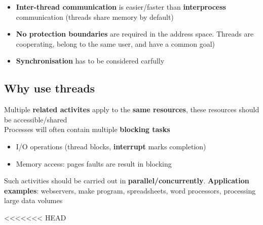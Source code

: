 \documentclass{article}
\begin{document}
\begin{itemize}
	\item \textbf{Inter-thread communication} is easier/faster than \textbf{interprocess} communication (threads share memory by default)
	\item \textbf{No protection boundaries} are required in the address space. Threads are cooperating, belong to the same user, and have a common goal)
	\item \textbf{Synchronisation} has to be considered carfully
\end{itemize}

\subsection{Why use threads}
\begin{flushleft}
Multiple \textbf{related activites} apply to the \textbf{same resources}, these resources should be accessible/shared\\
Processes will often contain multiple \textbf{blocking tasks}
\begin{itemize}
	\item I/O operations (thread blocks, \textbf{interrupt} marks completion)
	\item Memory access: pages faults are result in blocking
\end{itemize}
Such activities should be carried out in \textbf{parallel/concurrently}. \textbf{Application examples}: webservers, make program, spreadsheets, word processors, processing large data volumes
\end{flushleft}
<<<<<<< HEAD
\pagebreak
\end{document}
